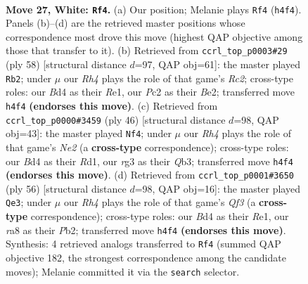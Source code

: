\documentclass[11pt]{article}
\begin{document}
\clearpage

\begin{figure}[p]\centering
\begin{subfigure}{0.46\textwidth}\centering
\resizebox{\linewidth}{!}{%
\newchessgame
\chessboard[
  setfen={rnb1k3/8/4q3/p2p4/1p1B3R/6r1/PPPQ2P1/RN4K1 w q - 0 27},
  showmover=false,
  pgfstyle=straightmove, color=movearrow, markmove={h4-f4}
]}
\caption{}
\end{subfigure}\hfill
\begin{subfigure}{0.46\textwidth}\centering
\resizebox{\linewidth}{!}{%
\newchessgame
\chessboard[
  setfen={1r5k/3b2p1/1q1p3p/1P2r3/4p3/1Q2P3/2R1B1PP/4R1K1 w - - 2 30},
  showmover=false,
  pgfstyle=straightmove, color=movearrow, markmove={c2-b2}
]}
\caption{}
\end{subfigure}
\\[4pt]
\begin{subfigure}{0.46\textwidth}\centering
\resizebox{\linewidth}{!}{%
\newchessgame
\chessboard[
  setfen={2r1k3/6p1/pn2p3/qp1p4/3P3b/1Q1BP3/PP2N3/1K1R4 w - - 0 24},
  showmover=false,
  pgfstyle=straightmove, color=movearrow, markmove={e2-f4}
]}
\caption{}
\end{subfigure}\hfill
\begin{subfigure}{0.46\textwidth}\centering
\resizebox{\linewidth}{!}{%
\newchessgame
\chessboard[
  setfen={1r4k1/3b2p1/4p2p/8/p2PBr1q/5Q2/PPR2P1P/4R1K1 w - - 0 29},
  showmover=false,
  pgfstyle=straightmove, color=movearrow, markmove={f3-e3}
]}
\caption{}
\end{subfigure}
\caption{\textbf{Move 27, White: \texttt{Rf4}.} (a) Our position; Melanie plays \texttt{Rf4} (\texttt{h4f4}). Panels (b)--(d) are the retrieved master positions whose correspondence most drove this move (highest QAP objective among those that transfer to it). (b) Retrieved from \texttt{ccrl\_top\_p0003\#29} (ply 58) [structural distance $d$=97, QAP obj=61]: the master played \texttt{Rb2}; under $\mu$ our \emph{Rh4} plays the role of that game's \emph{Rc2}; cross-type roles: our \emph{B}d4 as their \emph{R}e1, our \emph{P}c2 as their \emph{B}e2; transferred move \texttt{h4f4} \textbf{(endorses this move)}. (c) Retrieved from \texttt{ccrl\_top\_p0000\#3459} (ply 46) [structural distance $d$=98, QAP obj=43]: the master played \texttt{Nf4}; under $\mu$ our \emph{Rh4} plays the role of that game's \emph{Ne2} (a \textbf{cross-type} correspondence); cross-type roles: our \emph{B}d4 as their \emph{R}d1, our \emph{r}g3 as their \emph{Q}b3; transferred move \texttt{h4f4} \textbf{(endorses this move)}. (d) Retrieved from \texttt{ccrl\_top\_p0001\#3650} (ply 56) [structural distance $d$=98, QAP obj=16]: the master played \texttt{Qe3}; under $\mu$ our \emph{Rh4} plays the role of that game's \emph{Qf3} (a \textbf{cross-type} correspondence); cross-type roles: our \emph{B}d4 as their \emph{R}e1, our \emph{r}a8 as their \emph{P}b2; transferred move \texttt{h4f4} \textbf{(endorses this move)}. Synthesis: 4 retrieved analogs transferred to \texttt{Rf4} (summed QAP objective 182, the strongest correspondence among the candidate moves); Melanie committed it via the \texttt{search} selector.}
\label{fig:thought-m52}
\end{figure}
\end{document}
